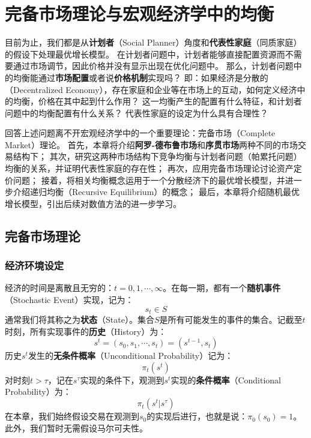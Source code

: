 

\chapter{完备市场理论与宏观经济学中的均衡}

目前为止，我们都是从\textbf{计划者}（Social Planner）角度和\textbf{代表性家庭}（同质家庭）的假设下处理最优增长模型。
在计划者问题中，计划者能够直接配置资源而不需要通过市场调节，因此价格并没有显示出现在优化问题中。
那么，计划者问题中的均衡能通过\textbf{市场配置}或者说\textbf{价格机制}实现吗？
即：如果经济是分散的（Decentralized Economy），存在家庭和企业等在市场上的互动，如何定义经济中的均衡，价格在其中起到什么作用？
这一均衡产生的配置有什么特征，和计划者问题中的均衡配置有什么关系？
代表性家庭的设定为什么具有合理性？

回答上述问题离不开宏观经济学中的一个重要理论：完备市场（Complete Market）理论。
首先，本章将介绍\textbf{阿罗-德布鲁市场}和\textbf{序贯市场}两种不同的市场交易结构下；
其次，研究这两种市场结构下竞争均衡与计划者问题（帕累托问题）均衡的关系，并证明代表性家庭的存在性；
再次，应用完备市场理论讨论资产定价问题；
接着，将相关均衡概念运用于一个分散经济下的最优增长模型，并进一步介绍递归均衡（Recursive Equilibrium）的概念；
最后，本章将介绍随机最优增长模型，引出后续对数值方法的进一步学习。


\section{完备市场理论}


\subsection{经济环境设定}

经济的时间是离散且无穷的：$t=0,1,\cdots, \infty$。在每一期，都有一个\textbf{随机事件}（Stochastic Event）实现，记为：
$$s_t\in S$$
通常我们将其称之为\textbf{状态}（State）。集合$S$是所有可能发生的事件的集合。记截至$t$时刻，所有实现事件的\textbf{历史}（History）为：
$$s^t = \left(s_0,s_1,\cdots,s_t\right) = \left(s^{t-1},s_t\right)$$
历史$s^t$发生的\textbf{无条件概率}（Unconditional Probability）记为：
$$\pi_t\left(s^t\right)$$
对时刻$t>\tau$，记在$s^{\tau}$实现的条件下，观测到$s^t$实现的\textbf{条件概率}（Conditional Probability）为：
$$\pi_t\left(s^t|s^{\tau}\right)$$
在本章，我们始终假设交易在观测到$s_0$的实现后进行，也就是说：$\pi_0\left(s_0\right)=1$。此外，我们暂时无需假设马尔可夫性。

